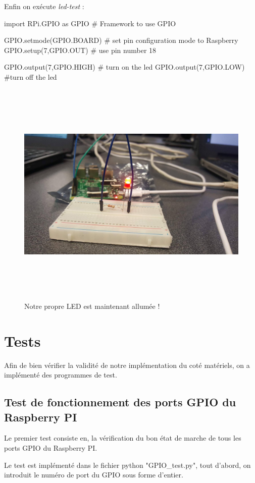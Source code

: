\documentclass[12pt,a4paper]{article}
\begin{document}
Enfin on exécute \textit{led-test} : \newpage

\begin{python}
import RPi.GPIO as GPIO  # Framework to use GPIO

GPIO.setmode(GPIO.BOARD) # set pin configuration mode to Raspberry
GPIO.setup(7,GPIO.OUT)  # use pin number 18

 GPIO.output(7,GPIO.HIGH) # turn on the led
 GPIO.output(7,GPIO.LOW) #turn off the led 
\end{python}
\begin{figure}[ht]
  \centering
    \includegraphics[width = 15cm,height=11cm]{led2.png}
     \caption{Notre propre LED est maintenant allumée ! 
      }
\end{figure}

\section{Tests}
Afin de bien vérifier la validité de notre implémentation du coté matériels, on a implémenté des programmes de test.\par

\subsection{Test de fonctionnement des ports GPIO du Raspberry PI}
Le premier test consiste en, la vérification du bon état de marche de tous les ports GPIO du Raspberry PI.\par
Le test est implémenté dans le fichier python "GPIO\_test.py", tout d'abord, on introduit le numéro de port du GPIO sous forme d'entier. 
\end{document}
